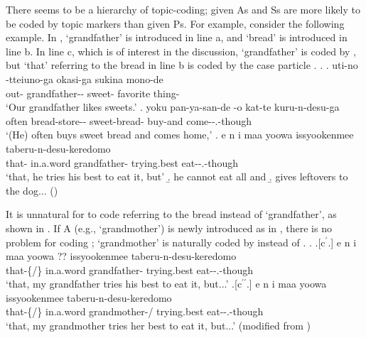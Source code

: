 There seems to be a hierarchy of topic-coding;
given As and Ss are more likely to be coded by topic markers than given Ps.
For example, consider the following example.
In \Next,
 `grandfather' is introduced in line a, and
 `bread' is introduced in line b.
In line c, which is of interest in the discussion,
 `grandfather' is coded by , but
 `that' referring to the bread in line b is coded by the case particle .
%
\ex.
 \ag. uti-no -tteiuno-ga okasi-ga sukina mono-de \\
 		out- grandfather-- sweet- favorite thing- \\
		`Our grandfather likes sweets.'
 \bg. yoku pan-ya-san-de -o kat-te kuru-n-desu-ga \\
   often bread-store-- sweet-bread- buy-and come--.-though \\
   `(He) often buys sweet bread and comes home,'
 \bg. e n  i maa yoowa  issyookenmee taberu-n-desu-keredomo \\
     that-   in.a.word grandfather- trying.best eat--.-though \\
   `that, he tries his best to eat it, but'
 \b. he cannot eat all and
 \b. gives leftovers to the dog...
  \hfill{()}

It is unnatural for  to code  referring to the bread
instead of  `grandfather',
as shown in \Next[c$^{\prime}$].
If A (e.g.,  `grandmother') is newly introduced as in ,
there is no problem for  coding ;
 `grandmother' is naturally coded by  instead of .
%
\ex.
 \ag.[c$^{\prime}$.] e n  i maa yoowa ?? issyookenmee taberu-n-desu-keredomo \\
     that-\{/\}   in.a.word grandfather- trying.best eat--.-though \\
   `that, my grandfather tries his best to eat it, but...'
  \bg.[c$^{\prime\prime}$.] e n  i maa yoowa  issyookenmee taberu-n-desu-keredomo \\
     that-\{/\}   in.a.word grandmother-/ trying.best eat--.-though \\
   `that, my grandmother tries her best to eat it, but...'
   \hfill{(modified from \Last[c])}

